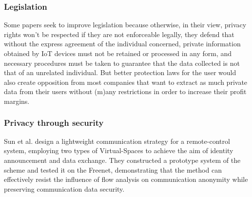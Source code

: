 \documentclass[conference]{IEEEtran}
\begin{document}

\subsubsection{Legislation}

Some papers seek to improve legislation \cite{WEBER2015618, FabianoInternet}
because otherwise, in their view, privacy rights won't be respected if they
are not enforceable legally, they defend that without the express agreement
of the individual concerned, private information obtained by IoT devices
must not be retained or processed in any form, and necessary procedures must
be taken to guarantee that the data collected is not that of an unrelated
individual. But better protection laws for the user would also create opposition
from most companies that want to extract as much private data from their
users without (m)any restrictions in order to increase their profit margins.

\subsubsection{Privacy through security}

Sun et al. \cite{SunSecure} design a lightweight communication strategy for
a remote-control system, employing two types of Virtual-Spaces to achieve the
aim of identity announcement and data exchange. They constructed a prototype
system of the scheme and tested it on the Freenet, demonstrating that the
method can effectively resist the influence of flow analysis on communication
anonymity while preserving communication data security.
\end{document}
